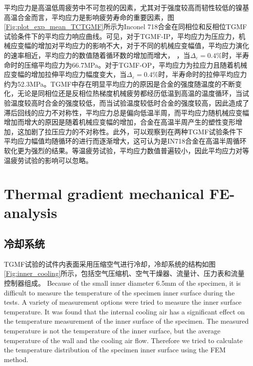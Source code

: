 平均应力是高温低周疲劳中不可忽视的因素，尤其对于强度较高而韧性较低的镍基高温合金而言，平均应力是影响疲劳寿命的重要因素，图\ref{Fig:plot_exp_mean_TCTGMF}所示为Inconel 718合金在同相位和反相位TGMF试验条件下的平均应力响应曲线。可见，对于TGMF-IP，平均应力为压应力，机械应变幅的增加对平均应力的影响不大，对于不同的机械应变幅值，平均应力演化的速率相近，平均应力的数值随着循环数的增加而增大，
，当$\Delta_{\varepsilon}=0.4\%$时，半寿命时的压缩平均应力为66.7MPa。对于TGMF-OP，平均应力为拉应力且随着机械应变幅的增加拉伸平均应力幅度变大，当$\Delta_{\varepsilon}=0.4\%$时，半寿命时的拉伸平均应力约为52.3MPa。TGMF中存在明显平均应力的原因是合金的强度随温度的不断变化，无论是同相位还是反相位热梯度机械疲劳都经历低温到高温的温度循环，当试验温度较高时合金的强度较低，而当试验温度较低时合金的强度较高，因此造成了滞后回线的应力不对称性，平均应力总是偏向低温半周，而平均应力随机械应变幅增加而增大的原因是随着机械应变幅的增加，合金在高温半周产生的塑性变形增加，这加剧了拉压应力的不对称性。此外，可以观察到在两种TGMF试验条件下平均应力幅值均随循环的进行而逐渐增大，这可认为是IN718合金在高温半周循环软化更为强烈的结果。等温疲劳试验，平均应力数值普遍较小，因此平均应力对等温疲劳试验的影响可以忽略。


\section{Thermal gradient mechanical FE-analysis}

\subsection{冷却系统}


TGMF试验的试件内表面采用压缩空气进行冷却，冷却系统的结构如图\ref{Fig:inner_cooling}所示，包括空气压缩机、空气干燥器、流量计、压力表和流量控制器组成。
Because of the small inner diameter 6.5mm of the specimen, it is difficult to measure the temperature of the specimen inner surface during the tests.
A variety of measurement options were tried to measure the inner surface temperature.
It was found that the internal cooling air has a significant effect on the temperature measurement of the inner surface of the specimen.
The measured temperature is not the temperature of the inner surface, but the average temperature of the wall and the cooling air flow.
Therefore we tried to calculate the temperature distribution of the specimen inner surface using the FEM method.

